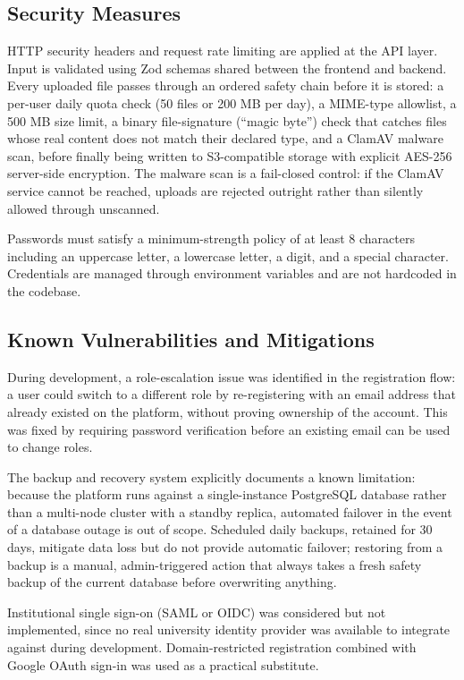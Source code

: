 \documentclass[12pt]{article}
\begin{document}
\subsection{Security Measures}
HTTP security headers and request rate limiting are applied at the API layer. Input is validated using Zod schemas shared between the frontend and backend. Every uploaded file passes through an ordered safety chain before it is stored: a per-user daily quota check (50 files or 200 MB per day), a MIME-type allowlist, a 500 MB size limit, a binary file-signature (``magic byte'') check that catches files whose real content does not match their declared type, and a ClamAV malware scan, before finally being written to S3-compatible storage with explicit AES-256 server-side encryption. The malware scan is a fail-closed control: if the ClamAV service cannot be reached, uploads are rejected outright rather than silently allowed through unscanned.

Passwords must satisfy a minimum-strength policy of at least 8 characters including an uppercase letter, a lowercase letter, a digit, and a special character. Credentials are managed through environment variables and are not hardcoded in the codebase.

\subsection{Known Vulnerabilities and Mitigations}
During development, a role-escalation issue was identified in the registration flow: a user could switch to a different role by re-registering with an email address that already existed on the platform, without proving ownership of the account. This was fixed by requiring password verification before an existing email can be used to change roles.

The backup and recovery system explicitly documents a known limitation: because the platform runs against a single-instance PostgreSQL database rather than a multi-node cluster with a standby replica, automated failover in the event of a database outage is out of scope. Scheduled daily backups, retained for 30 days, mitigate data loss but do not provide automatic failover; restoring from a backup is a manual, admin-triggered action that always takes a fresh safety backup of the current database before overwriting anything.

Institutional single sign-on (SAML or OIDC) was considered but not implemented, since no real university identity provider was available to integrate against during development. Domain-restricted registration combined with Google OAuth sign-in was used as a practical substitute.
\end{document}
